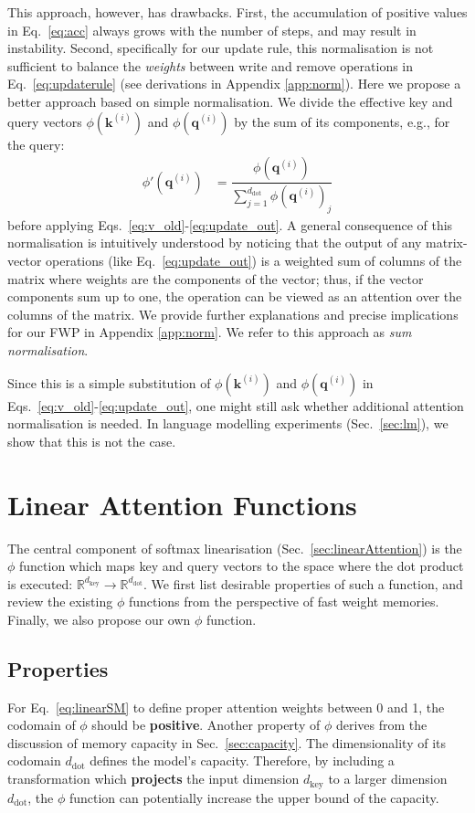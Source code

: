 \documentclass{article}
\def\vk{{\bm{k}}}
\def\vq{{\bm{q}}}
\theoremstyle{definition}
\begin{document}
This approach, however, has drawbacks.
First, the accumulation of positive values in Eq.~\ref{eq:acc} always grows with the number of steps,
and may result in instability.
Second, specifically for our update rule, 
this normalisation is not sufficient to balance the \textit{weights} between write
and remove operations in Eq.~\ref{eq:updaterule}
(see derivations in Appendix \ref{app:norm}).
Here we propose a better approach based on simple normalisation.
We divide the effective key and query vectors $\phi(\vk^{(i)})$ and $\phi(\vq^{(i)})$
by the sum of its components, e.g., for the query:
\begin{align}
\phi'(\vq^{(i)}) &= \displaystyle \dfrac{\phi(\vq^{(i)})}{ \displaystyle \sum_{j=1}^{d_\text{dot}} \phi(\vq^{(i)})_j}
\end{align}
before applying  Eqs.~\ref{eq:v_old}-\ref{eq:update_out}.
A general consequence of this normalisation is  intuitively understood 
by noticing that the output of any matrix-vector operations
(like Eq.~\ref{eq:update_out}) is a
weighted sum of columns of the matrix where weights are the components
of the vector; thus, if the vector components sum up to one,
the operation can be viewed as an attention over the columns of the matrix.
We provide further explanations and precise
implications for our FWP in Appendix \ref{app:norm}.
We refer to this approach as \textit{sum normalisation}.

Since this is a simple substitution of $\phi(\vk^{(i)})$ and $\phi(\vq^{(i)})$ in Eqs.~\ref{eq:v_old}-\ref{eq:update_out},
one might still ask whether additional attention normalisation is needed.
In language modelling experiments (Sec.~\ref{sec:lm}), we show that this is not the case.

\section{Linear Attention Functions}
\label{sec:phi_section}
The central component of softmax linearisation (Sec.~\ref{sec:linearAttention}) is the $\phi$ function
which maps key and query vectors to the space where the dot product is executed: 
$\mathbb{R}^{d_\text{key}} \rightarrow \mathbb{R}^{d_\text{dot}}$. 
We first list desirable properties of such a function,
and review the existing $\phi$ functions from the perspective of fast weight memories. 
Finally, we also propose our own $\phi$ function.
\subsection{Properties}
\label{sec:phi_prop}
For Eq.~\ref{eq:linearSM} to define proper attention weights
between 0 and 1, the codomain of $\phi$ should be \textbf{positive}.
Another property of $\phi$ derives from the discussion of memory
capacity in Sec.~\ref{sec:capacity}.
The dimensionality of its codomain $d_\text{dot}$ defines the model's capacity.
Therefore, by including a transformation which \textbf{projects} the input dimension $d_\text{key}$
to a larger dimension $d_\text{dot}$, the $\phi$ function can potentially increase the upper bound
of the capacity.
\end{document}
